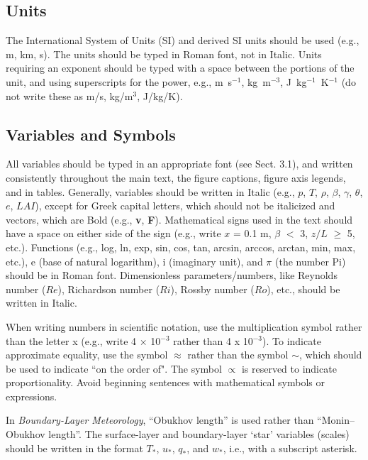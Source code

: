 \subsection{Units}
The International System of Units (SI) and derived SI units should be used (e.g., m, km, s). The units should be typed in Roman font, not in Italic. Units requiring an exponent should be typed with a space between the portions of the unit, and using superscripts for the power, e.g., m~s$^{-1}$, kg~m$^{-3}$, J~kg$^{-1}$~K$^{-1}$ (do not write these as m/s, kg/m$^3$, J/kg/K).

\subsection{Variables and Symbols}
All variables should be typed in an appropriate font (see Sect. 3.1), and written consistently throughout the main text, the figure captions, figure axis legends, and in tables. Generally, variables should be written in Italic (e.g., $p$, $T$, $\rho$, $\beta$, $\gamma$, $\theta$, $e$, $LAI$), except for Greek capital letters, which should not be italicized and vectors, which are Bold (e.g., \textbf{v}, \textbf{F}). Mathematical signs used in the text should have a space on either side of the sign (e.g., write $x$ = 0.1 m, $\beta$ $<$ 3, $z/L$ $\geq$ 5, etc.). Functions (e.g., log, ln, exp, sin, cos, tan, arcsin, arccos, arctan, min, max, etc.), e (base of natural logarithm), i (imaginary unit), and $\pi$ (the number Pi) should be in Roman font. Dimensionless parameters/numbers, like Reynolds number ($Re$), Richardson number ($Ri$), Rossby number ($Ro$), etc., should be written in Italic.

When writing numbers in scientific notation, use the multiplication symbol rather than the letter x (e.g., write 4 $\times$ 10$^{-3}$ rather than 4 x 10$^{-3}$). To indicate approximate equality, use the symbol $\approx$ rather than the symbol $\sim$, which should be used to indicate ``on the order of". The symbol $\propto$ is reserved to indicate proportionality. Avoid beginning sentences with mathematical symbols or expressions. 

In \textit{Boundary-Layer Meteorology}, ``Obukhov length'' is used rather than ``Monin--Obukhov length''. The surface-layer and boundary-layer `star' variables (scales) should be written in the format $T_*$, $u_*$, $q_*$, and $w_*$, i.e., with a subscript asterisk.

